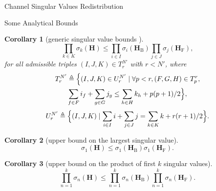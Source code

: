 \documentclass[journal]{IEEEtran}
\newtheorem{corollary}{Corollary}[proposition]
\begin{document}
\begin{section}{Channel Singular Values Redistribution}
\begin{subsection}{Some Analytical Bounds}
		\begin{corollary}[generic singular value bounds \cite{Fulton2000}]
			\begin{equation}
				\prod_{k \in {K}} \sigma_k(\mathbf{H}) \le \prod_{i \in {I}} \sigma_i(\mathbf{H}_\mathrm{B}) \prod_{j \in {J}} \sigma_j(\mathbf{H}_\mathrm{F}),
				\label{iq:sv_bound_fc}
			\end{equation}
			for all admissible triples $(I, J, K) \in T_r^{N'}$ with $r < N'$, where
			\begin{equation*}
				\begin{gathered}
					T_r^{N'} \triangleq \Bigl\{(I, J, K) \in U_r^{N'} \mid \forall p < r, (F, G, H) \in T_p^r,\\
					\sum_{f \in F} i_f + \sum_{g \in G} j_g \le \sum_{h \in H} k_h + p(p+1)/2 \Bigr\},
				\end{gathered}
			\end{equation*}
			\begin{equation*}
				U_r^{N'} \triangleq \Bigl\{(I, J, K) \mid \sum_{i \in I} i + \sum_{j \in J} j = \sum_{k \in K} k + r(r+1)/2\Bigr\}.
			\end{equation*}
		\end{corollary}

		\begin{corollary}[upper bound on the largest singular value]
			\begin{equation}
				\sigma_1(\mathbf{H}) \le \sigma_1(\mathbf{H}_\mathrm{B}) \sigma_1(\mathbf{H}_\mathrm{F}).
			\end{equation}
		\end{corollary}


		\begin{corollary}[upper bound on the product of first $k$ singular values]
			\begin{equation}
				\prod_{n=1}^k \sigma_n(\mathbf{H}) \le \prod_{n=1}^k \sigma_n(\mathbf{H}_\mathrm{B}) \prod_{n=1}^k \sigma_n(\mathbf{H}_\mathrm{F}).
			\end{equation}
		\end{corollary}


\end{subsection}
\end{section}
\end{document}
